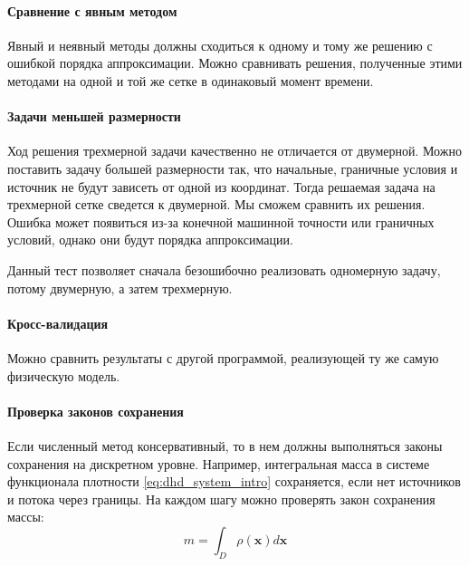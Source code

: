 \paragraph{Сравнение с явным методом}
Явный и неявный методы должны сходиться к одному и тому же решению с ошибкой порядка аппроксимации. Можно сравнивать решения, полученные этими методами на одной и той же сетке в одинаковый момент времени.

\paragraph{Задачи меньшей размерности}
Ход решения трехмерной задачи качественно не отличается от двумерной. Можно поставить задачу большей размерности так, что начальные, граничные условия и источник не будут зависеть от одной из координат. Тогда решаемая задача на трехмерной сетке сведется к двумерной. Мы сможем сравнить их решения. Ошибка может появиться из-за конечной машинной точности или граничных условий, однако они будут порядка аппроксимации.
\par
Данный тест позволяет сначала безошибочно реализовать одномерную задачу, потому двумерную, а затем трехмерную.

\paragraph{Кросс-валидация}
Можно сравнить результаты с другой программой, реализующей ту же самую физическую модель.

\paragraph{Проверка законов сохранения}
Если численный метод консервативный, то в нем должны выполняться законы сохранения на дискретном уровне. Например, интегральная масса в системе функционала плотности \eqref{eq:dhd_system_intro} сохраняется, если нет источников и потока через границы. На каждом шагу можно проверять закон сохранения массы: 
\begin{equation}
m = \int_{D} \rho(\mathbf{x}) d\mathbf{x}
\end{equation}

